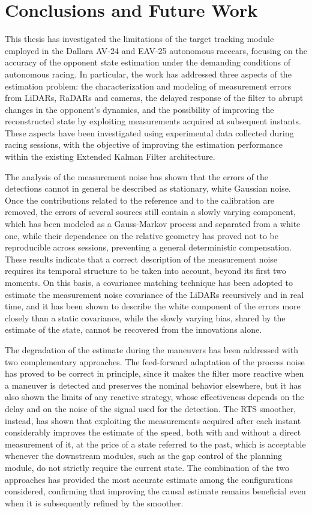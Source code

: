 \chapter{Conclusions and Future Work}
\label{ch:conclusions}

This thesis has investigated the limitations of the target tracking module employed in the Dallara AV-24 and EAV-25 autonomous racecars, focusing on the accuracy of the opponent state estimation under the demanding conditions of autonomous racing. In particular, the work has addressed three aspects of the estimation problem: the characterization and modeling of measurement errors from LiDARs, RaDARs and cameras, the delayed response of the filter to abrupt changes in the opponent's dynamics, and the possibility of improving the reconstructed state by exploiting measurements acquired at subsequent instants. These aspects have been investigated using experimental data collected during racing sessions, with the objective of improving the estimation performance within the existing Extended Kalman Filter architecture.


The analysis of the measurement noise has shown that the errors of the detections cannot in
general be described as stationary, white Gaussian noise. Once the contributions related to
the reference and to the calibration are removed, the errors of several sources still contain
a slowly varying component, which has been modeled as a Gauss-Markov process and separated
from a white one, while their dependence on the relative geometry has proved not to be
reproducible across sessions, preventing a general deterministic compensation. These results
indicate that a correct description of the measurement noise requires its temporal structure
to be taken into account, beyond its first two moments. On this basis, a covariance matching
technique has been adopted to estimate the measurement noise covariance of the LiDARs
recursively and in real time, and it has been shown to describe the white component of the
errors more closely than a static covariance, while the slowly varying bias, shared by the
estimate of the state, cannot be recovered from the innovations alone.

The degradation of the estimate during the maneuvers has been addressed with two complementary
approaches. The feed-forward adaptation of the process noise has proved to be correct in
principle, since it makes the filter more reactive when a maneuver is detected and preserves
the nominal behavior elsewhere, but it has also shown the limits of any reactive strategy,
whose effectiveness depends on the delay and on the noise of the signal used for the
detection. The RTS smoother, instead, has shown that exploiting the measurements acquired
after each instant considerably improves the estimate of the speed, both with and without a
direct measurement of it, at the price of a state referred to the past, which is acceptable
whenever the downstream modules, such as the gap control of the planning module, do not
strictly require the current state. The combination of the two approaches has provided the
most accurate estimate among the configurations considered, confirming that improving the
causal estimate remains beneficial even when it is subsequently refined by the smoother.

